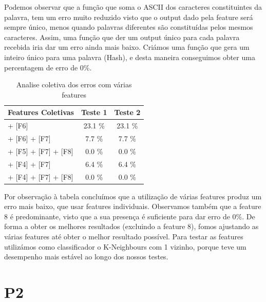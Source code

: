 \documentclass[11pt,twocolumn]{article}
\begin{document}
    Podemos observar que a função que soma o ASCII dos caracteres
    constituintes da palavra, tem um erro muito reduzido visto que o output dado pela feature será sempre único, menos quando palavras diferentes são constituídas pelos mesmos caracteres. 
    Assim, uma função que der um output único para cada palavra recebida iria dar um erro ainda mais baixo. Criámos uma função que gera um inteiro único para uma palavra (Hash), e desta maneira conseguimos obter uma percentagem de erro de 0\%.
    
    \begin{table}[htbp]
        \centering
        \caption{Analise coletiva dos erros com várias features}
        \label{my-label}
        \begin{tabular}{|l|c|c|}
        \hline
        \multicolumn{1}{|c|}{Features Coletivas}         & \textbf{Teste 1} & \textbf{Teste 2}                    \\ \hline
        [F5] + [F6] & 23.1 \% & 23.1 \% \\ \hline
        [F5] + [F6] + [F7]     & 7.7 \%  & 7.7 \%                   \\ \hline
        [F4] + [F5] + [F7] + [F8]   & 0.0 \%              & 0.0 \%                                 \\ \hline
        [F3] + [F4] + [F7]   & 6.4 \%             & 6.4 \%                                 \\ \hline
        [F3] + [F4] + [F7] + [F8]   & 0.0 \%          & 0.0 \%                                 \\ \hline
        \end{tabular}
        \end{table}
    \par  
    Por observação à tabela concluímos que a utilização de várias features produz um erro mais baixo, que usar features individuais. 
    Observamos também que a feature 8 é predominante, visto que a sua presença é suficiente para dar erro de 0\%. De forma a obter os melhores resultados (excluindo a feature 8), fomos ajustando as várias features até obter o melhor resultado possível. Para testar as features utilizámos 
    como classificador o K-Neighbours com 1 vizinho, porque teve um desempenho mais estável ao longo dos nossos testes.

\section*{P2}
\end{document}
